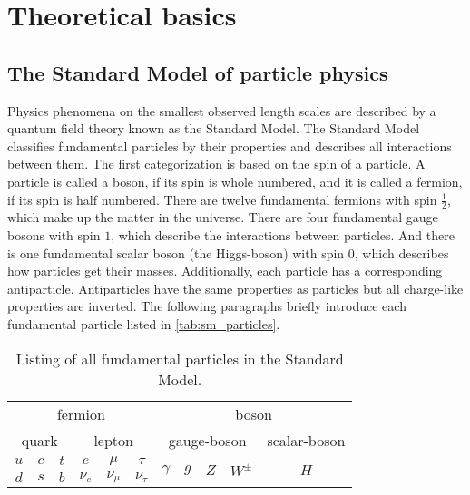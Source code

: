 \chapter{Theoretical basics}


\section{The Standard Model of particle physics}

Physics phenomena on the smallest observed length scales are described by a quantum field theory known as the Standard Model.
The Standard Model classifies fundamental particles by their properties and describes all interactions between them. 
The first categorization is based on the spin of a particle. 
A particle is called a boson, if its spin is whole numbered, and it is called a fermion, if its spin is half numbered.
There are twelve fundamental fermions with spin $\frac{1}{2}$, which make up the matter in the universe.
There are four fundamental gauge bosons with spin $1$, which describe the interactions between particles. 
And there is one fundamental scalar boson (the Higgs-boson) with spin $0$, which describes how particles get their masses.
Additionally, each particle has a corresponding antiparticle. 
Antiparticles have the same properties as particles but all charge-like properties are inverted.
The following paragraphs briefly introduce each fundamental particle listed in \autoref{tab:sm_particles}.

\begin{table}
    \centering
    \caption{Listing of all fundamental particles in the Standard Model.}
    \begin{tabular}{c c c | c c c | c c c c | c}
        \toprule
        \multicolumn{6}{c|}{fermion} & \multicolumn{5}{c}{boson} \\
        \multicolumn{3}{c}{quark} & \multicolumn{3}{c|}{lepton} & \multicolumn{4}{c}{gauge-boson} & \multicolumn{1}{c}{scalar-boson} \\
        \midrule
        $u$ & $c$ & $t$ & $e$ & $\mu$ & $\tau$ & \multirow{2}{*}{$\gamma$} & \multirow{2}{*}{$g$} & \multirow{2}{*}{$Z$} & \multirow{2}{*}{$W^\pm$} & \multirow{2}{*}{$H$} \\
        $d$ & $s$ & $b$ & $\nu_e$ & $\nu_\mu$ & $\nu_\tau$ &&&&& \\
        \bottomrule
    \end{tabular}
    \label{tab:sm_particles}
\end{table}


